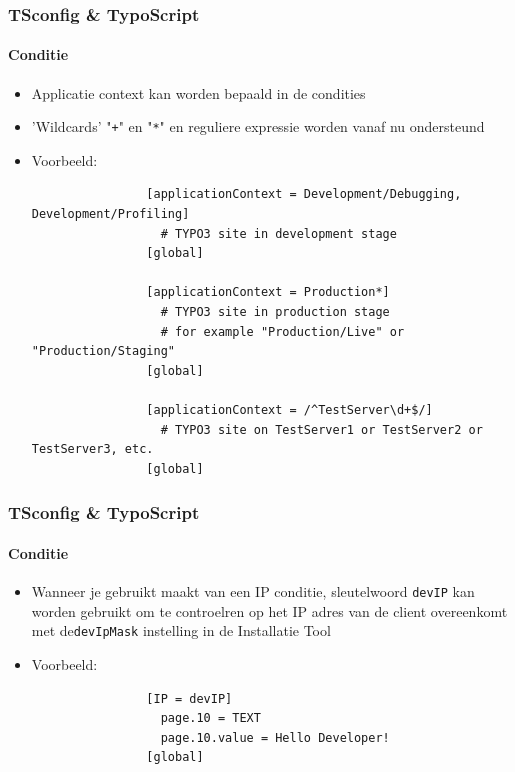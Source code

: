 \begin{frame}[fragile]
	\frametitle{TSconfig \& TypoScript}
	\framesubtitle{Conditie}

	\begin{itemize}
		\item Applicatie context kan worden bepaald in de condities 
		\item 'Wildcards' "\texttt{+}" en "\texttt{*}" en reguliere expressie worden vanaf nu ondersteund
		\item Voorbeeld:

			\lstset{
				basicstyle=\tiny\ttfamily
			}

			\begin{lstlisting}
				[applicationContext = Development/Debugging, Development/Profiling]
				  # TYPO3 site in development stage
				[global]

				[applicationContext = Production*]
				  # TYPO3 site in production stage
				  # for example "Production/Live" or "Production/Staging"
				[global]

				[applicationContext = /^TestServer\d+$/]
				  # TYPO3 site on TestServer1 or TestServer2 or TestServer3, etc.
				[global]
			\end{lstlisting}

	\end{itemize}

\end{frame}


\begin{frame}[fragile]
	\frametitle{TSconfig \& TypoScript}
	\framesubtitle{Conditie}

	\begin{itemize}

		\item Wanneer je gebruikt maakt van een IP conditie, sleutelwoord \texttt{devIP} kan worden gebruikt om te controelren op het IP adres van de client overeenkomt met de\texttt{devIpMask} instelling in de Installatie Tool
		\item Voorbeeld:


			\begin{lstlisting}
				[IP = devIP]
				  page.10 = TEXT
				  page.10.value = Hello Developer!
				[global]
			\end{lstlisting}

	\end{itemize}

\end{frame}

